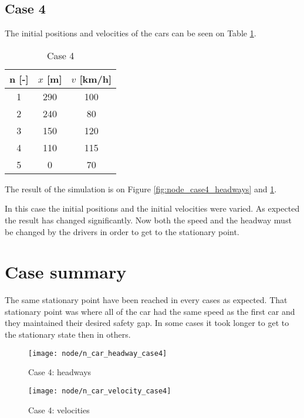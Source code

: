 		\subsection*{Case 4}
		The initial positions and velocities of the cars can be seen on Table \ref{tab:node_case4}.
		\begin{table}
			\centering
			\begin{tabular}{ |c|c|c| }
				\hline
				n [-] & $x$ [m] & $v$ [km/h]\\
				\hline
				1 &  290 & 100 \\
				2 & 240 & 80 \\
				3 & 150 & 120 \\
				4 & 110& 115 \\
				5 & 0 & 70 \\
				\hline
			\end{tabular}
			\caption{Case 4}
			\label{tab:node_case4}
		\end{table}
		The result of the simulation is on Figure \ref{fig:node_case4_headways} and \ref{fig:node_case4_velocities}. 

		In this case the initial positions and the initial velocities were varied. As expected the result has changed significantly. Now both the speed and the headway must be changed by the drivers in order to get to the stationary point.
		\section*{Case summary}
		The same stationary point have been reached in every cases as expected. That stationary point was where all of the car had the same speed as the first car and they maintained their desired safety gap. In some cases it took longer to get to the stationary state then in others.
		\begin{figure}
			\centering
			\begin{minipage}{.5\textwidth}
				\centering
				\texttt{[image: node/n\_car\_headway\_case4]}
				\caption{Case 4: headways}
				\label{fig:node_case4_headways}
			\end{minipage}\hfill
			\begin{minipage}{.5\textwidth}
				\centering
				\texttt{[image: node/n\_car\_velocity\_case4]}
				\caption{Case 4: velocities}
				\label{fig:node_case4_velocities}
			\end{minipage}
		\end{figure}
